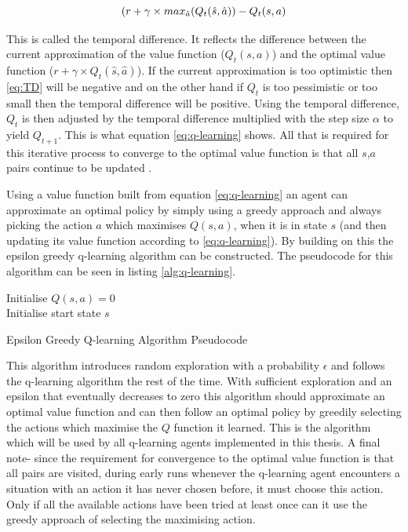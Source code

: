 \begin{equation}\label{eq:TD}
(r + \gamma \times max_{\hat{a}}(Q_t(\hat{s},\hat{a})) - Q_t(s,a)\\
\end{equation}

This is called the temporal difference. It reflects the difference between the current approximation of the value function ($Q_t(s,a)$) and the optimal value function ($r + \gamma \times Q_t(\hat{s},\hat{a})$). If the current approximation is too optimistic then \ref{eq:TD} will be negative and on the other hand if $Q_t$ is too pessimistic or too small then the temporal difference will be positive. Using the temporal difference, $Q_t$ is then adjusted by the temporal difference multiplied with the step size $\alpha$ to yield $Q_{t+1}$. This is what equation \ref{eq:q-learning} shows. All that is required for this iterative process to converge to the optimal value function is that all $s$,$a$ pairs continue to be updated \cite{sutton_barto}.

Using a value function built from equation \ref{eq:q-learning} an agent can approximate an optimal policy by simply using a greedy approach and always picking the action $a$ which maximises $Q(s,a)$, when it is in state $s$ (and then updating its value function according to \ref{eq:q-learning}). By building on this the epsilon greedy q-learning algorithm can be constructed. The pseudocode for this algorithm can be seen in listing \ref{alg:q-learning}.

\begin{algorithm}[h]
Initialise $Q(s,a) = 0$\\
Initialise start state $s$\\
\caption{Epsilon Greedy Q-learning Algorithm Pseudocode}
\label{alg:q-learning}
\end{algorithm}

This algorithm introduces random exploration with a probability $\epsilon$ and follows the q-learning algorithm the rest of the time. With sufficient exploration and an epsilon that eventually decreases to zero this algorithm should approximate an optimal value function and can then follow an optimal policy by greedily selecting the actions which maximise the $Q$ function it learned. This is the algorithm which will be used by all q-learning agents implemented in this thesis. A final note- since the requirement for convergence to the optimal value function is that all pairs are visited, during early runs whenever the q-learning agent encounters a situation with an action it has never chosen before, it must choose this action. Only if all the available actions have been tried at least once can it use the greedy approach of selecting the maximising action.

